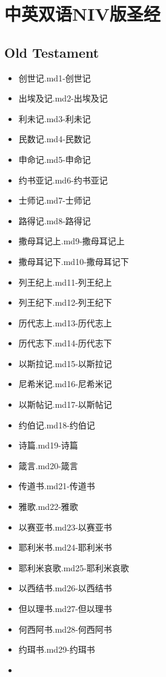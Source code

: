 \documentclass{article}
\begin{document}
\section{中英双语NIV版圣经}\label{header-n0}
\subsection{Old Testament}\label{header-n2}
\begin{itemize}
\item
  {创世记.md}{1-创世记}
\item
  {出埃及记.md}{2-出埃及记}
\item
  {利未记.md}{3-利未记}
\item
  {民数记.md}{4-民数记}
\item
  {申命记.md}{5-申命记}
\item
  {约书亚记.md}{6-约书亚记}
\item
  {士师记.md}{7-士师记}
\item
  {路得记.md}{8-路得记}
\item
  {撒母耳记上.md}{9-撒母耳记上}
\item
  {撒母耳记下.md}{10-撒母耳记下}
\item
  {列王纪上.md}{11-列王纪上}
\item
  {列王纪下.md}{12-列王纪下}
\item
  {历代志上.md}{13-历代志上}
\item
  {历代志下.md}{14-历代志下}
\item
  {以斯拉记.md}{15-以斯拉记}
\item
  {尼希米记.md}{16-尼希米记}
\item
  {以斯帖记.md}{17-以斯帖记}
\item
  {约伯记.md}{18-约伯记}
\item
  {诗篇.md}{19-诗篇}
\item
  {箴言.md}{20-箴言}
\item
  {传道书.md}{21-传道书}
\item
  {雅歌.md}{22-雅歌}
\item
  {以赛亚书.md}{23-以赛亚书}
\item
  {耶利米书.md}{24-耶利米书}
\item
  {耶利米哀歌.md}{25-耶利米哀歌}
\item
  {以西结书.md}{26-以西结书}
\item
  {但以理书.md}{27-但以理书}
\item
  {何西阿书.md}{28-何西阿书}
\item
  {约珥书.md}{29-约珥书}
\item

\end{itemize}
\end{document}
